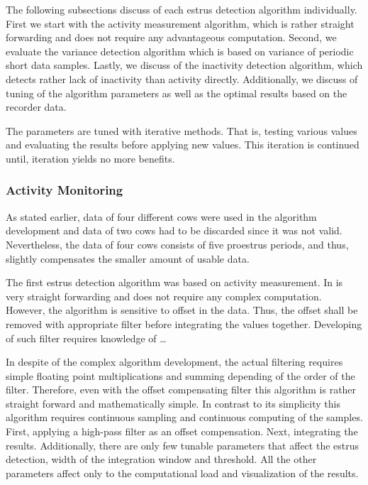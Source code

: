 \documentclass[english,12pt,a4paper,pdftex,elec,utf8]{aaltothesis}
\begin{document}
The following subsections discuss of each estrus detection algorithm individually. First we start with the activity measurement algorithm, which is rather straight forwarding and does not require any advantageous computation. Second, we evaluate the variance detection algorithm which is based on variance of periodic short data samples. Lastly, we discuss of the inactivity detection algorithm, which detects rather lack of inactivity than activity directly. Additionally, we discuss of tuning of the algorithm parameters as well as the optimal results based on the recorder data. 

The parameters are tuned with iterative methods. That is, testing various values and evaluating the results before applying new values. This iteration is continued until, iteration yields no more benefits.


\subsubsection{Activity Monitoring} \label{activitymeasurementevaluation}






As stated earlier, data of four different cows were used in the algorithm development and data of two cows had to be discarded since it was not valid. Nevertheless, the data of four cows consists of five proestrus periods, and thus, slightly compensates the smaller amount of usable data.

The first estrus detection algorithm was based on activity measurement. In is very straight forwarding and does not require any complex computation. However, the algorithm is sensitive to offset in the data. Thus, the offset shall be removed with appropriate filter before integrating the values together. Developing of such filter requires knowledge of \dots

In despite of the complex algorithm development, the actual filtering requires simple floating point multiplications and summing depending of the order of the filter. Therefore, even with the offset compensating filter this algorithm is rather straight forward and mathematically simple. In contrast to its simplicity this algorithm requires continuous sampling and continuous computing of the samples. First, applying a high-pass filter as an offset compensation. Next, integrating the results. Additionally, there are only few tunable parameters that affect the estrus detection, width of the integration window and threshold. All the other parameters affect only to the computational load and visualization of the results.\\
\end{document}
